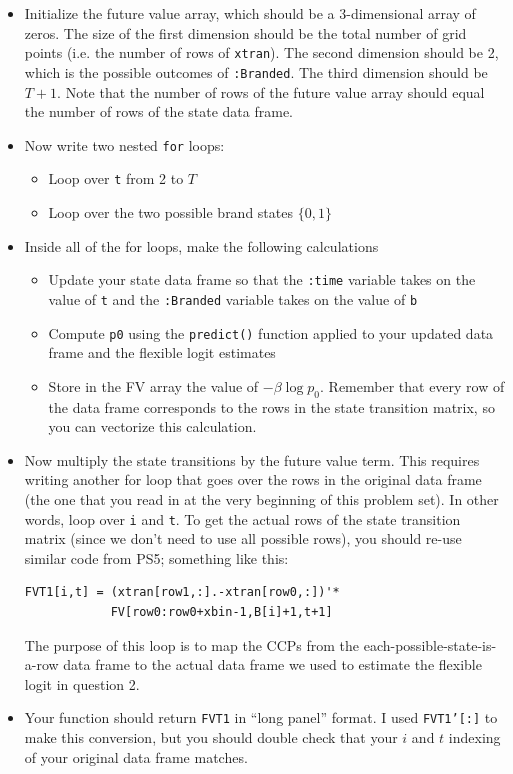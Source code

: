 \documentclass[12pt,english]{article}
\begin{document}
\begin{enumerate}
\begin{enumerate}
\begin{itemize}
            \item Initialize the future value array, which should be a 3-dimensional array of zeros. The size of the first dimension should be the total number of grid points (i.e. the number of rows of \texttt{xtran}). The second dimension should be 2, which is the possible outcomes of \texttt{:Branded}. The third dimension should be $T+1$. Note that the number of rows of the future value array should equal the number of rows of the state data frame.
            \item Now write two nested \texttt{for} loops:
            \begin{itemize}
                \item Loop over \texttt{t} from 2 to $T$
                \item Loop over the two possible brand states $\{0,1\}$
            \end{itemize}
            \item Inside all of the for loops, make the following calculations
            \begin{itemize}
                \item Update your state data frame so that the \texttt{:time} variable takes on the value of \texttt{t} and the \texttt{:Branded} variable takes on the value of \texttt{b}
                \item Compute \texttt{p0} using the \texttt{predict()} function applied to your updated data frame and the flexible logit estimates
                \item Store in the FV array the value of $-\beta \log p_0$. Remember that every row of the data frame corresponds to the rows in the state transition matrix, so you can vectorize this calculation.
            \end{itemize}
            \item Now multiply the state transitions by the future value term. This requires writing another for loop that goes over the rows in the original data frame (the one that you read in at the very beginning of this problem set). In other words, loop over \texttt{i} and \texttt{t}. To get the actual rows of the state transition matrix (since we don't need to use all possible rows), you should re-use similar code from PS5; something like this:
                \begin{verbatim}
FVT1[i,t] = (xtran[row1,:].-xtran[row0,:])'*
            FV[row0:row0+xbin-1,B[i]+1,t+1]
                \end{verbatim}
            The purpose of this loop is to map the CCPs from the each-possible-state-is-a-row data frame to the actual data frame we used to estimate the flexible logit in question 2.
            \item Your function should return \texttt{FVT1} in ``long panel'' format. I used \texttt{FVT1'[:]} to make this conversion, but you should double check that your $i$ and $t$ indexing of your original data frame matches.
        \end{itemize}
        

\end{enumerate}
\end{enumerate}
\end{document}
